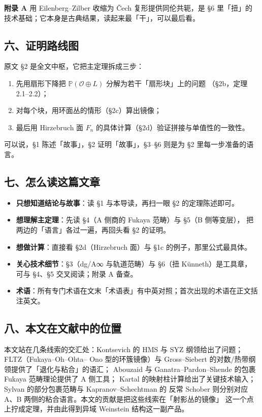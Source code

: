 \documentclass[11pt,a4paper]{article}
\theoremstyle{cnth}
\begin{document}
\textbf{附录 A} 用 Eilenberg–Zilber 收缩为 Čech 复形提供同伦共轭，是 §6 里「扭」的
技术基础；它本身是古典结果，读起来最「干」，可以最后看。

\subsection*{六、证明路线图}

原文 §2 是全文中枢，它把主定理拆成三步：
\begin{enumerate}
\item 先用扇形下降把 $\mathbb{P}(\mathcal{O}\oplus L)$ 分解为若干「扇形块」上的问题
      （§2b，定理 2.1–2.2）；
\item 对每个块，用环面丛的情形（§2c）算出镜像；
\item 最后用 Hirzebruch 面 $F_n$ 的具体计算（§2d）验证拼接与单值性的一致性。
\end{enumerate}
可以说，§1 陈述「故事」，§2 证明「故事」，§3–§6 则是为 §2 里每一步准备的语言。

\subsection*{七、怎么读这篇文章}

\begin{itemize}
\item \textbf{只想知道结论与故事}：读 §1 与本导读，再扫一眼 §2 的定理陈述即可。
\item \textbf{想理解主定理}：先读 §4（A 侧商的 Fukaya 范畴）与 §5（B 侧等变层），
      把两边的「语言」各过一遍，再回头看 §2 的证明。
\item \textbf{想做计算}：直接看 §2d（Hirzebruch 面）与 §1c 的例子，那里公式最具体。
\item \textbf{关心技术细节}：§3（dg/A∞ 与轨道范畴）与 §6（扭 Künneth）是工具章，
      可与 §4、§5 交叉阅读；附录 A 备查。
\item \textbf{术语}：所有专门术语在文末「术语表」有中英对照；首次出现的术语在正文括注英文。
\end{itemize}

\subsection*{八、本文在文献中的位置}

本文站在几条线索的交汇处：Kontsevich 的 HMS 与 SYZ 纲领给出了问题；FLTZ（Fukaya–Oh–Ohta–
Ono 型的环簇镜像）与 Gross–Siebert 的对数/热带纲领提供了「退化与粘合」的语汇；
Abouzaid 与 Ganatra–Pardon–Shende 的包裹 Fukaya 范畴理论提供了 A 侧工具；
Kartal 的映射柱计算给出了关键技术输入；Sylvan 的部分包裹范畴与 Kapranov–Schechtman 的
反常 Schober 则分别对应 A、B 两侧的粘合语言。本文的贡献是把这些线索在「射影丛的镜像」
这一个点上拧成定理，并由此得到异域 Weinstein 结构这一副产品。
\end{document}
